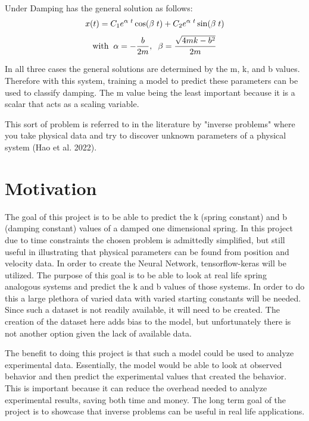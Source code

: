 \documentclass[12pt]{article}
\begin{document}
	Under Damping has the general solution as follows:
	\begin{equation}
	x(t) = C_1e^{\alpha \hspace{1mm} t}\cos(\beta \hspace{1mm} t)+C_2e^{\alpha \hspace{1mm} t}\sin(\beta \hspace{1mm} t)
	\end{equation}
	$$ \text{with}\hspace{2mm} \alpha = -\dfrac{b}{2m}, \hspace{2mm} \beta = \dfrac{\sqrt{4mk-b^2}}{2m}$$


	In all three cases the general solutions are determined by the m, k, and b values. Therefore with this system, training a model to predict these parameters can be used to classify damping. The m value being the least important because it is a scalar that acts as a scaling variable.

	This sort of problem is referred to in the literature by "inverse problems" where you take physical data and try to discover unknown parameters of a physical system (Hao et al. 2022).

	\section*{Motivation}

	The goal of this project is to be able to predict the k (spring constant) and b (damping constant) values of a damped one dimensional spring. In this project due to time constraints the chosen problem is admittedly simplified, but still useful in illustrating that physical parameters can be found from position and velocity data. In order to create the Neural Network, tensorflow-keras will be utilized. The purpose of this goal is to be able to look at real life spring analogous systems and predict the k and b values of those systems. In order to do this a large plethora of varied data with varied starting constants will be needed. Since such a dataset is not readily available, it will need to be created. The creation of the dataset here adds bias to the model, but unfortunately there is not another option given the lack of available data.

	The benefit to doing this project is that such a model could be used to analyze experimental data. Essentially, the model would be able to look at observed behavior and then predict the experimental values that created the behavior. This is important because it can reduce the overhead needed to analyze experimental results, saving both time and money. The long term goal of the project is to showcase that inverse problems can be useful in real life applications.
\end{document}
